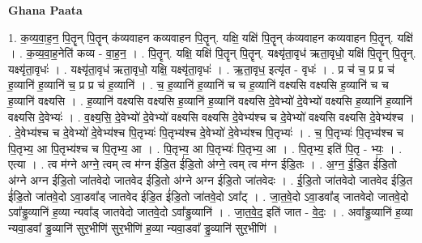 \documentclass[17pt]{extarticle}
\begin{document}
\textbf{Ghana Paata } \newline

1. क॒व्य॒वा॒ह॒न॒ पि॒तॄन् पि॒तॄन् क॑व्यवाहन कव्यवाहन पि॒तॄन्. यक्षि॒ यक्षि॑ पि॒तॄन् क॑व्यवाहन कव्यवाहन पि॒तॄन्. यक्षि॑ । . क॒व्य॒वा॒ह॒नेति॑ कव्य - वा॒ह॒न॒ । . पि॒तॄन्. यक्षि॒ यक्षि॑ पि॒तॄन् पि॒तॄन्. यक्ष्यृ॑ता॒वृध॑ ऋता॒वृधो॒ यक्षि॑ पि॒तॄन् पि॒तॄन्. यक्ष्यृ॑ता॒वृधः॑ । . यक्ष्यृ॑ता॒वृध॑ ऋता॒वृधो॒ यक्षि॒ यक्ष्यृ॑ता॒वृधः॑ । . ऋ॒ता॒वृध॒ इत्यृ॑त - वृधः॑ । . प्र च॑ च॒ प्र प्र च॑ ह॒व्यानि॑ ह॒व्यानि॑ च॒ प्र प्र च॑ ह॒व्यानि॑ । . च॒ ह॒व्यानि॑ ह॒व्यानि॑ च च ह॒व्यानि॑ वक्ष्यसि वक्ष्यसि ह॒व्यानि॑ च च ह॒व्यानि॑ वक्ष्यसि । . ह॒व्यानि॑ वक्ष्यसि वक्ष्यसि ह॒व्यानि॑ ह॒व्यानि॑ वक्ष्यसि दे॒वेभ्यो॑ दे॒वेभ्यो॑ वक्ष्यसि ह॒व्यानि॑ ह॒व्यानि॑ वक्ष्यसि दे॒वेभ्यः॑ । . व॒क्ष्य॒सि॒ दे॒वेभ्यो॑ दे॒वेभ्यो॑ वक्ष्यसि वक्ष्यसि दे॒वेभ्य॑श्च च दे॒वेभ्यो॑ वक्ष्यसि वक्ष्यसि दे॒वेभ्य॑श्च । . दे॒वेभ्य॑श्च च दे॒वेभ्यो॑ दे॒वेभ्य॑श्च पि॒तृभ्यः॑ पि॒तृभ्य॑श्च दे॒वेभ्यो॑ दे॒वेभ्य॑श्च पि॒तृभ्यः॑ । . च॒ पि॒तृभ्यः॑ पि॒तृभ्य॑श्च च पि॒तृभ्य॒ आ पि॒तृभ्य॑श्च च पि॒तृभ्य॒ आ । . पि॒तृभ्य॒ आ पि॒तृभ्यः॑ पि॒तृभ्य॒ आ । . पि॒तृभ्य॒ इति॑ पि॒तृ - भ्यः॒ । . एत्या । . त्व म॑ग्ने अग्ने॒ त्वम् त्व म॑ग्न ईडि॒त ई॑डि॒तो अ॑ग्ने॒ त्वम् त्व म॑ग्न ईडि॒तः । . अ॒ग्न॒ ई॒डि॒त ई॑डि॒तो अ॑ग्ने अग्न ईडि॒तो जा॑तवेदो जातवेद ईडि॒तो अ॑ग्ने अग्न ईडि॒तो जा॑तवेदः । . ई॒डि॒तो जा॑तवेदो जातवेद ईडि॒त ई॑डि॒तो जा॑तवे॒दो ऽवा॒डवा᳚ड् जातवेद ईडि॒त ई॑डि॒तो जा॑तवे॒दो ऽवा᳚ट् । . जा॒त॒वे॒दो ऽवा॒डवा᳚ड् जातवेदो जातवे॒दो ऽवा᳚ड्ढ॒व्यानि॑ ह॒व्या न्यवा᳚ड् जातवेदो जातवे॒दो ऽवा᳚ड्ढ॒व्यानि॑ । . जा॒त॒वे॒द॒ इति॑ जात - वे॒दः॒ । . अवा᳚ड्ढ॒व्यानि॑ ह॒व्या न्यवा॒डवा᳚ ड्ढ॒व्यानि॑ सुर॒भीणि॑ सुर॒भीणि॑ ह॒व्या न्यवा॒डवा᳚ ड्ढ॒व्यानि॑ सुर॒भीणि॑ । \newline
\end{document}
